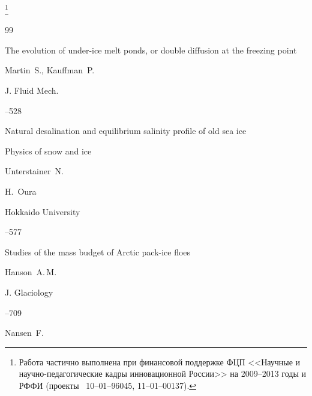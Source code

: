 {

\thanks{Работа частично выполнена при финансовой поддержке ФЦП <<Научные и научно-педагогические кадры инновационной России>> на 2009--2013 годы и РФФИ (проекты \linebreak \No\No\ 10{--}01{--}96045, 11{--}01{--}00137).}





}



\pagebreak



\begin{thebibliography}{99}




\paper The evolution of under-ice melt ponds, or double diffusion at the freezing point

\by Martin~S., Kauffman~P.

\jour J. Fluid Mech.




--528




\paper Natural desalination and equilibrium salinity profile of old sea ice

\inbook Physics of snow and ice

\by Unterstainer~N.

\ed H.~Oura

\publaddr Hokkaido University



--577




\paper Studies of the mass budget of Arctic pack-ice floes

\by Hanson~A.\,M.

\jour J. Glaciology




--709




\by Nansen~F.


\end{thebibliography}
